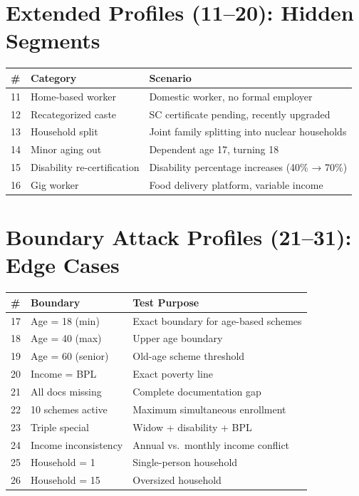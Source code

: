 \documentclass[11pt,a4paper]{report}
\begin{document}
\section{Extended Profiles (11--20): Hidden Segments}

\begin{table}[H]
\centering
\small
\begin{tabular}{p{0.7cm}p{2.5cm}p{5cm}}
\toprule
\# & Category & Scenario \\
\midrule
11 & Home-based worker & Domestic worker, no formal employer \\
12 & Recategorized caste & SC certificate pending, recently upgraded \\
13 & Household split & Joint family splitting into nuclear households \\
14 & Minor aging out & Dependent age 17, turning 18 \\
15 & Disability re-certification & Disability percentage increases (40\% → 70\%) \\
16 & Gig worker & Food delivery platform, variable income \\
\bottomrule
\end{tabular}
\end{table}

\section{Boundary Attack Profiles (21--31): Edge Cases}

\begin{table}[H]
\centering
\small
\begin{tabular}{p{0.7cm}p{3cm}p{4cm}}
\toprule
\# & Boundary & Test Purpose \\
\midrule
17 & Age = 18 (min) & Exact boundary for age-based schemes \\
18 & Age = 40 (max) & Upper age boundary \\
19 & Age = 60 (senior) & Old-age scheme threshold \\
20 & Income = BPL & Exact poverty line \\
21 & All docs missing & Complete documentation gap \\
22 & 10 schemes active & Maximum simultaneous enrollment \\
23 & Triple special & Widow + disability + BPL \\
24 & Income inconsistency & Annual vs.\ monthly income conflict \\
25 & Household = 1 & Single-person household \\
26 & Household = 15 & Oversized household \\
\bottomrule
\end{tabular}
\end{table}
\end{document}
